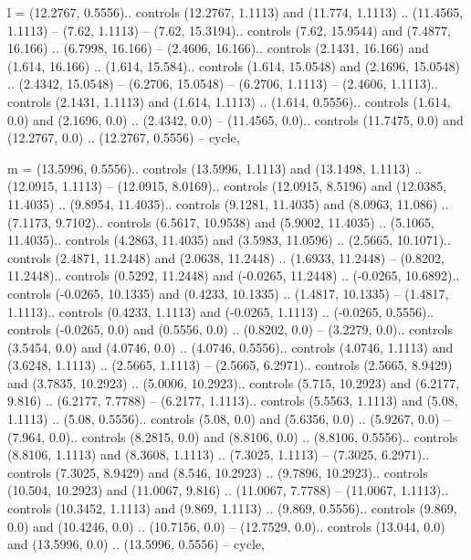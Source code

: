 l = {(12.2767, 0.5556).. controls (12.2767, 1.1113) and (11.774, 1.1113) .. (11.4565, 1.1113) -- (7.62, 1.1113) -- (7.62, 15.3194).. controls (7.62, 15.9544) and (7.4877, 16.166) .. (6.7998, 16.166) -- (2.4606, 16.166).. controls (2.1431, 16.166) and (1.614, 16.166) .. (1.614, 15.584).. controls (1.614, 15.0548) and (2.1696, 15.0548) .. (2.4342, 15.0548) -- (6.2706, 15.0548) -- (6.2706, 1.1113) -- (2.4606, 1.1113).. controls (2.1431, 1.1113) and (1.614, 1.1113) .. (1.614, 0.5556).. controls (1.614, 0.0) and (2.1696, 0.0) .. (2.4342, 0.0) -- (11.4565, 0.0).. controls (11.7475, 0.0) and (12.2767, 0.0) .. (12.2767, 0.5556) -- cycle},

m = {(13.5996, 0.5556).. controls (13.5996, 1.1113) and (13.1498, 1.1113) .. (12.0915, 1.1113) -- (12.0915, 8.0169).. controls (12.0915, 8.5196) and (12.0385, 11.4035) .. (9.8954, 11.4035).. controls (9.1281, 11.4035) and (8.0963, 11.086) .. (7.1173, 9.7102).. controls (6.5617, 10.9538) and (5.9002, 11.4035) .. (5.1065, 11.4035).. controls (4.2863, 11.4035) and (3.5983, 11.0596) .. (2.5665, 10.1071).. controls (2.4871, 11.2448) and (2.0638, 11.2448) .. (1.6933, 11.2448) -- (0.8202, 11.2448).. controls (0.5292, 11.2448) and (-0.0265, 11.2448) .. (-0.0265, 10.6892).. controls (-0.0265, 10.1335) and (0.4233, 10.1335) .. (1.4817, 10.1335) -- (1.4817, 1.1113).. controls (0.4233, 1.1113) and (-0.0265, 1.1113) .. (-0.0265, 0.5556).. controls (-0.0265, 0.0) and (0.5556, 0.0) .. (0.8202, 0.0) -- (3.2279, 0.0).. controls (3.5454, 0.0) and (4.0746, 0.0) .. (4.0746, 0.5556).. controls (4.0746, 1.1113) and (3.6248, 1.1113) .. (2.5665, 1.1113) -- (2.5665, 6.2971).. controls (2.5665, 8.9429) and (3.7835, 10.2923) .. (5.0006, 10.2923).. controls (5.715, 10.2923) and (6.2177, 9.816) .. (6.2177, 7.7788) -- (6.2177, 1.1113).. controls (5.5563, 1.1113) and (5.08, 1.1113) .. (5.08, 0.5556).. controls (5.08, 0.0) and (5.6356, 0.0) .. (5.9267, 0.0) -- (7.964, 0.0).. controls (8.2815, 0.0) and (8.8106, 0.0) .. (8.8106, 0.5556).. controls (8.8106, 1.1113) and (8.3608, 1.1113) .. (7.3025, 1.1113) -- (7.3025, 6.2971).. controls (7.3025, 8.9429) and (8.546, 10.2923) .. (9.7896, 10.2923).. controls (10.504, 10.2923) and (11.0067, 9.816) .. (11.0067, 7.7788) -- (11.0067, 1.1113).. controls (10.3452, 1.1113) and (9.869, 1.1113) .. (9.869, 0.5556).. controls (9.869, 0.0) and (10.4246, 0.0) .. (10.7156, 0.0) -- (12.7529, 0.0).. controls (13.044, 0.0) and (13.5996, 0.0) .. (13.5996, 0.5556) -- cycle},

